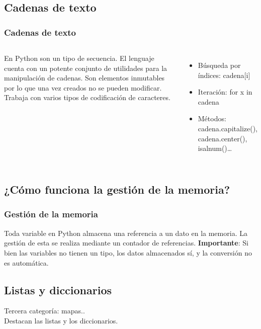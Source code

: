 \documentclass{beamer}
\begin{document}
\subsection{Cadenas de texto}
\begin{frame}
\frametitle{Cadenas de texto}
\begin{columns}[c]
En Python son un tipo de secuencia. El lenguaje cuenta con un potente conjunto de utilidades para la manipulación de cadenas. Son elementos inmutables por lo que una vez creados no se pueden modificar. Trabaja con varios tipos de codificación de caracteres.

\begin{itemize}
\item Búsqueda por índices: cadena[i]
\item Iteración: for x in cadena
\item Métodos: cadena.capitalize(), cadena.center(), isalnum()\dots
\end{itemize}
\end{columns}
\end{frame}

\subsection{¿Cómo funciona la gestión de la memoria?}
\begin{frame}
\frametitle{Gestión de la memoria}
Toda variable en Python almacena una referencia a un dato en la memoria. La gestión de esta se realiza mediante un contador de referencias.\newline
\textbf{Importante}: Si bien las variables no tienen un tipo, los datos almacenados sí, y la conversión no es automática.
\end{frame}

\subsection{Listas y diccionarios}
\begin{frame}
Tercera categoría: mapas..\\
Destacan las listas y los diccionarios.
\end{frame}
\end{document}
